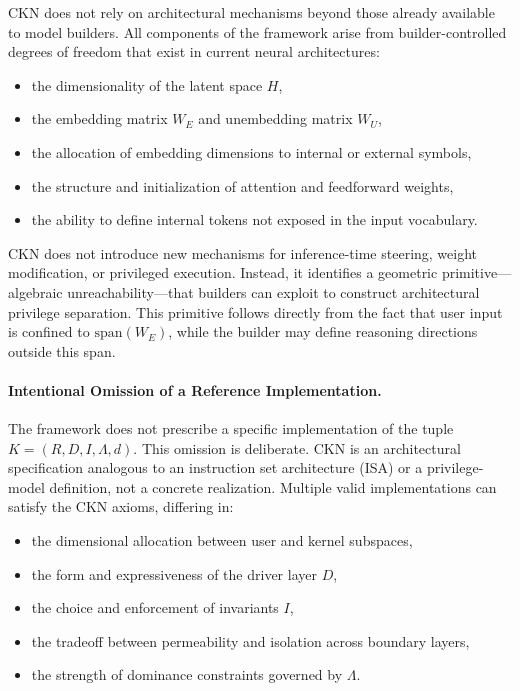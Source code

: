 \documentclass[11pt,a4paper]{article}
\begin{document}
CKN does not rely on architectural mechanisms beyond those already available to model builders. All components of the framework arise from builder-controlled degrees of freedom that exist in current neural architectures:
\begin{itemize}
    \item the dimensionality of the latent space $H$,
    \item the embedding matrix $W_E$ and unembedding matrix $W_U$,
    \item the allocation of embedding dimensions to internal or external symbols,
    \item the structure and initialization of attention and feedforward weights,
    \item the ability to define internal tokens not exposed in the input vocabulary.
\end{itemize}

CKN does not introduce new mechanisms for inference-time steering, weight modification, or privileged execution. Instead, it identifies a geometric primitive---algebraic unreachability---that builders can exploit to construct architectural privilege separation. This primitive follows directly from the fact that user input is confined to $\text{span}(W_E)$, while the builder may define reasoning directions outside this span.

\paragraph{Intentional Omission of a Reference Implementation.}

The framework does not prescribe a specific implementation of the tuple $K = (R, D, I, \Lambda, d)$. This omission is deliberate. CKN is an architectural specification analogous to an instruction set architecture (ISA) or a privilege-model definition, not a concrete realization. Multiple valid implementations can satisfy the CKN axioms, differing in:
\begin{itemize}
    \item the dimensional allocation between user and kernel subspaces,
    \item the form and expressiveness of the driver layer $D$,
    \item the choice and enforcement of invariants $I$,
    \item the tradeoff between permeability and isolation across boundary layers,
    \item the strength of dominance constraints governed by $\Lambda$.
\end{itemize}
\end{document}
